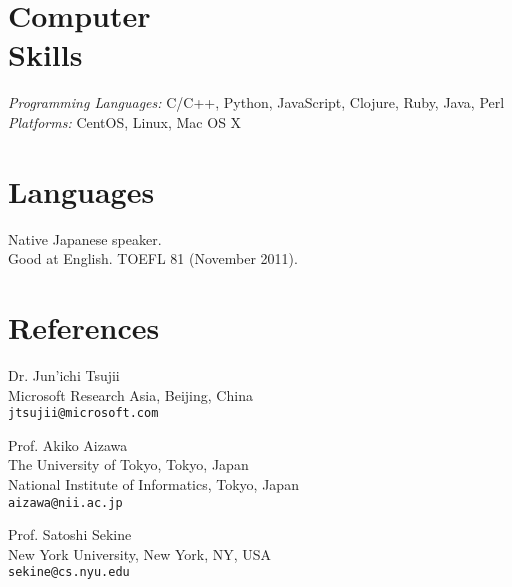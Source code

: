 \documentclass[margin]{res}
\begin{document}
\begin{resume}
\section{Computer \\ Skills}
\textit{Programming Languages:} C/C++, Python, JavaScript, Clojure, Ruby, Java, Perl \\
\textit{Platforms:} CentOS, Linux, Mac OS X\\

\section{Languages}
Native Japanese speaker.\\
Good at English. TOEFL 81 (November 2011). \\

\section{References} 
Dr. Jun'ichi Tsujii \\
Microsoft Research Asia, Beijing, China\\
{\tt jtsujii@microsoft.com}

Prof. Akiko Aizawa \\
The University of Tokyo, Tokyo, Japan\\
National Institute of Informatics, Tokyo, Japan\\
{\tt aizawa@nii.ac.jp}

Prof. Satoshi Sekine \\
New York University, New York, NY, USA\\
{\tt sekine@cs.nyu.edu}

\end{resume}
\end{document}
